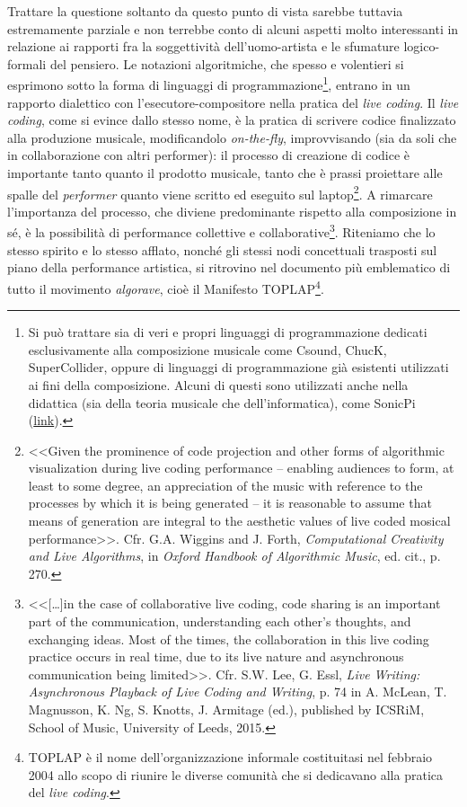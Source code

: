 \documentclass[a4paper,12pt]{scrartcl}
\newcommand{\omissis}{[\dots\unkern]}
\begin{document}
	Trattare la questione soltanto da questo punto di vista sarebbe tuttavia estremamente parziale e non terrebbe conto di alcuni aspetti molto interessanti in relazione ai rapporti fra la soggettività dell'uomo-artista e le sfumature logico-formali del pensiero. Le notazioni algoritmiche, che spesso e volentieri si esprimono sotto la forma di linguaggi di programmazione\footnote{Si può trattare sia di veri e propri linguaggi di programmazione dedicati esclusivamente alla composizione musicale come Csound, ChucK, SuperCollider, oppure di linguaggi di programmazione già esistenti utilizzati ai fini della composizione. Alcuni di questi sono utilizzati anche nella didattica (sia della teoria musicale che dell'informatica), come  SonicPi (\href{https://sonic-pi.net}{link}).},
	entrano in un rapporto dialettico con l'esecutore-compositore nella pratica del \emph{live coding}. Il \emph{live coding}, come si evince dallo stesso nome, è la pratica di scrivere codice finalizzato alla produzione musicale, modificandolo \emph{on-the-fly}, improvvisando (sia da soli che in collaborazione con altri performer): il processo di creazione di codice è importante tanto quanto il prodotto musicale, tanto che è prassi proiettare alle spalle del \textit{performer} quanto viene scritto ed eseguito sul laptop\footnote{<<Given the prominence of code projection and other forms of algorithmic visualization during live coding performance -- enabling audiences to form, at least to some degree, an appreciation of the music with reference to the processes by which it is being generated -- it is reasonable to assume that means of generation are integral to the aesthetic values of live coded mosical performance>>. Cfr. G.A. Wiggins and J. Forth, \textit{Computational Creativity and Live Algorithms}, in \textit{Oxford Handbook of Algorithmic Music}, ed. cit., p. 270.}. 
	A rimarcare l'importanza del processo, che diviene predominante rispetto alla composizione in sé, è la possibilità di performance collettive e collaborative\footnote{<<\omissis in the case of collaborative live coding, code sharing is an important part of the communication, understanding each other's thoughts, and exchanging ideas. Most of the times, the collaboration in this live coding practice occurs in real time, due to its live nature and asynchronous communication being limited>>. Cfr. S.W. Lee, G. Essl, \textit{Live Writing: Asynchronous Playback of Live Coding and Writing}, p. 74 in A. McLean, T. Magnusson, K. Ng, S. Knotts, J. Armitage (ed.), published by ICSRiM, School of Music, University of Leeds, 2015.}. 
	Riteniamo che lo stesso spirito e lo stesso afflato, nonché gli stessi nodi concettuali trasposti sul piano della performance artistica, si ritrovino nel documento più emblematico di tutto il movimento \emph{algorave}, cioè il Manifesto TOPLAP\footnote{TOPLAP è il nome dell'organizzazione informale costituitasi nel febbraio 2004 allo scopo di riunire le diverse comunità che si dedicavano alla pratica del \emph{live coding}.}. 
\end{document}
